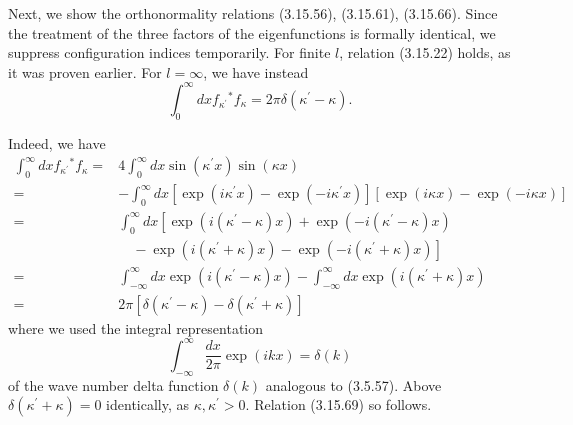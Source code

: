 \documentclass{article}
\begin{document}
Next, we show the orthonormality relations (3.15.56), (3.15.61), (3.15.66). Since the treatment of the three factors of the eigenfunctions is formally identical, we suppress configuration indices temporarily. For finite $l$, relation (3.15.22) holds, as it was proven earlier. For $l=\infty$, we have instead
$$
\begin{equation*}
\int_{0}^{\infty} d x f_{\kappa^{\prime}}{ }^{*} f_{\kappa}=2 \pi \delta\left(\kappa^{\prime}-\kappa\right) . \tag{3.15.69}
\end{equation*}
$$

Indeed, we have
$$
\begin{align*}
\int_{0}^{\infty} d x f_{\kappa^{\prime}}{ }^{*} f_{\kappa}= & 4 \int_{0}^{\infty} d x \sin \left(\kappa^{\prime} x\right) \sin (\kappa x)  \tag{3.15.70}\\
= & -\int_{0}^{\infty} d x\left[\exp \left(i \kappa^{\prime} x\right)-\exp \left(-i \kappa^{\prime} x\right)\right][\exp (i \kappa x)-\exp (-i \kappa x)] \\
= & \int_{0}^{\infty} d x\left[\exp \left(i\left(\kappa^{\prime}-\kappa\right) x\right)+\exp \left(-i\left(\kappa^{\prime}-\kappa\right) x\right)\right. \\
& \left.\quad-\exp \left(i\left(\kappa^{\prime}+\kappa\right) x\right)-\exp \left(-i\left(\kappa^{\prime}+\kappa\right) x\right)\right] \\
= & \int_{-\infty}^{\infty} d x \exp \left(i\left(\kappa^{\prime}-\kappa\right) x\right)-\int_{-\infty}^{\infty} d x \exp \left(i\left(\kappa^{\prime}+\kappa\right) x\right) \\
= & 2 \pi\left[\delta\left(\kappa^{\prime}-\kappa\right)-\delta\left(\kappa^{\prime}+\kappa\right)\right]
\end{align*}
$$
where we used the integral representation
$$
\begin{equation*}
\int_{-\infty}^{\infty} \frac{d x}{2 \pi} \exp (i k x)=\delta(k) \tag{3.15.71}
\end{equation*}
$$
of the wave number delta function $\delta(k)$ analogous to (3.5.57). Above $\delta\left(\kappa^{\prime}+\kappa\right)=0$ identically, as $\kappa, \kappa^{\prime}>0$. Relation (3.15.69) so follows.
\end{document}
